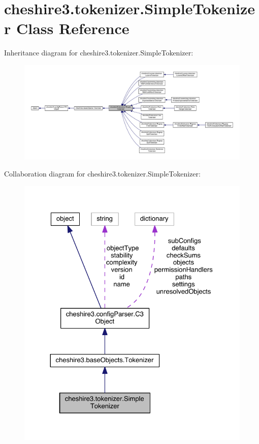 \hypertarget{classcheshire3_1_1tokenizer_1_1_simple_tokenizer}{\section{cheshire3.\-tokenizer.\-Simple\-Tokenizer Class Reference}
\label{classcheshire3_1_1tokenizer_1_1_simple_tokenizer}
}


Inheritance diagram for cheshire3.\-tokenizer.\-Simple\-Tokenizer\-:
\nopagebreak
\begin{figure}[H]
\begin{center}
\leavevmode
\includegraphics[width=350pt]{classcheshire3_1_1tokenizer_1_1_simple_tokenizer__inherit__graph}
\end{center}
\end{figure}


Collaboration diagram for cheshire3.\-tokenizer.\-Simple\-Tokenizer\-:
\nopagebreak
\begin{figure}[H]
\begin{center}
\leavevmode
\includegraphics[width=326pt]{classcheshire3_1_1tokenizer_1_1_simple_tokenizer__coll__graph}
\end{center}
\end{figure}
